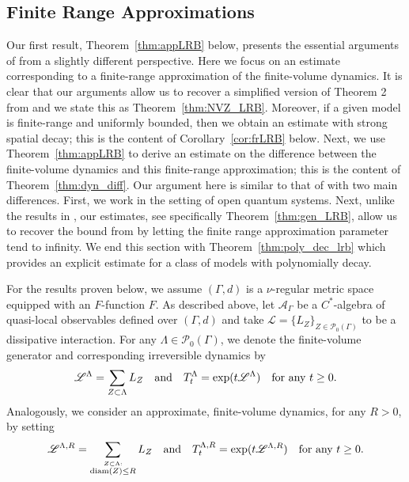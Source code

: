 \documentclass{article}
\newcommand{\<}{\langle}
\renewcommand{\>}{\rangle}
\numberwithin{equation}{section}
\theoremstyle{definition}
\begin{document}

\subsection{Finite Range Approximations} \label{sec:fra}
Our first result, Theorem~\ref{thm:appLRB} below, presents the essential arguments of \cite{NachtergaeleVershyninaZagrebnov} from a 
slightly different perspective. Here we focus on an estimate corresponding to a finite-range approximation of the finite-volume dynamics. 
It is clear that our arguments allow us to recover a simplified version of Theorem 2 from \cite{NachtergaeleVershyninaZagrebnov} and we state this as
Theorem~\ref{thm:NVZ_LRB}. Moreover, if a given model is finite-range and uniformly bounded, then we obtain an estimate
with strong spatial decay; this is the content of Corollary~\ref{cor:frLRB} below. 
Next, we use Theorem~\ref{thm:appLRB} to derive an estimate on the difference between the finite-volume dynamics 
and this finite-range approximation; this is the content of Theorem~\ref{thm:dyn_diff}. Our argument here is similar to that of 
\cite{Matsuta} with two main differences. First, we work in the setting of open quantum systems.
Next, unlike the results in \cite{Matsuta}, our estimates, see specifically Theorem~\ref{thm:gen_LRB}, allow us to recover the bound from \cite{NachtergaeleVershyninaZagrebnov} by letting the finite range approximation parameter
tend to infinity. We end this section with Theorem~\ref{thm:poly_dec_lrb} which provides an explicit estimate for
a class of models with polynomially decay.   



For the results proven below, we assume $(\Gamma, d)$ is a $\nu$-regular metric space equipped with an $F$-function $F$.
As described above, let $\mathcal{A}_{\Gamma}$ be a $C^*$-algebra of quasi-local observables defined over $(\Gamma, d)$ and take
$\mathscr{L} = \{ L_Z \}_{Z \in \mathcal{P}_0(\Gamma)}$ to be a dissipative interaction. For any $\Lambda \in \mathcal{P}_0(\Gamma)$, we denote 
the finite-volume generator and corresponding irreversible dynamics by
\begin{equation}
\mathscr{L}^{\Lambda} = \sum_{Z \subset \Lambda} L_Z \quad \mbox{and} \quad  T_t^{\Lambda} = {\rm exp}(t \mathscr{L}^{\Lambda}) \quad \mbox{for any } t \geq 0. 
\end{equation}
Analogously, we consider an approximate, finite-volume dynamics, for any $R>0$, by setting
\begin{equation}
\mathscr{L}^{\Lambda, R} = \sum_{\stackrel{Z \subset \Lambda:}{{\rm diam}(Z) \leq R}} L_Z \quad \mbox{and} \quad  T_t^{\Lambda, R} = {\rm exp}(t \mathscr{L}^{\Lambda, R}) \quad \mbox{for any } t \geq 0. 
\end{equation}
\end{document}
